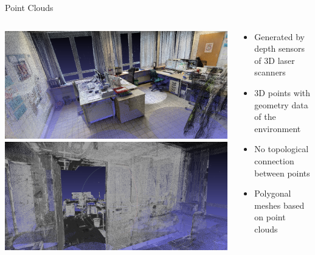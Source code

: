 \documentclass{beamer}
\begin{document}
\begin{frame}{Point Clouds}
	\begin{columns}
		\begin{column}{0.5\textwidth}
			\includegraphics[width=1.0\textwidth]{point_cloud_1.png}\\
			\vspace{0.1cm}
			\includegraphics[width=1.0\textwidth]{police_point_cloud.png}
		\end{column}
		\begin{column}{0.5\textwidth}
			\begin{itemize}
				\item Generated by depth sensors of 3D laser scanners
				\item 3D points with geometry data of the environment
				\item No topological connection between points
				\item Polygonal meshes based on point clouds
			\end{itemize}
		\end{column}
	\end{columns}
\end{frame}
\end{document}
